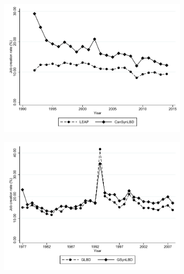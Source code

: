 \begin{figure}
\begin{subfigure}[h]{0.48\linewidth}
\includegraphics[trim=0 40 0 0,clip, width=\linewidth]{graphs/Job_creation_rate_by_year_private_bw.pdf}
\end{subfigure}
\hfill
\begin{subfigure}[h]{0.48\linewidth}
\includegraphics[trim=0 40 0 0,clip,width=\linewidth]{graphs/Job_creation_rate_by_year_bw_GsynLBD.pdf}
\end{subfigure}\\
\begin{subfigure}[h]{0.48\linewidth}

\end{subfigure}
\end{figure}
